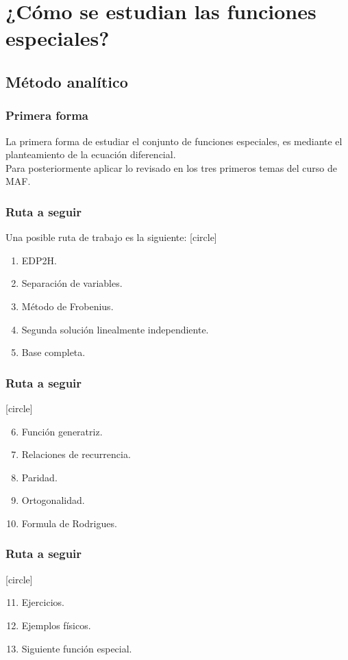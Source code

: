 \documentclass[12pt]{beamer}
\begin{document}
\section{¿Cómo se estudian las funciones especiales?}
\subsection{Método analítico}

\begin{frame}
\frametitle{Primera forma}
La primera forma de estudiar el conjunto de funciones especiales, es mediante el planteamiento de la ecuación diferencial.
\\
\bigskip
\pause
Para posteriormente aplicar lo revisado en los tres primeros temas del curso de MAF.
\end{frame}
\begin{frame}
\frametitle{Ruta a seguir}
Una posible ruta de trabajo es la siguiente:
[circle]
\begin{enumerate}[<+->]
\item EDP2H.
\item Separación de variables.
\item Método de Frobenius.
\item Segunda solución linealmente independiente.
\item Base completa.
\end{enumerate}
\end{frame}
\begin{frame}
\frametitle{Ruta a seguir}
[circle]
\begin{enumerate}[<+->]
\setcounter{enumi}{5}
\item Función generatriz.
\item Relaciones de recurrencia.
\item Paridad.
\item Ortogonalidad.
\item Formula de Rodrigues.
\end{enumerate}
\end{frame}
\begin{frame}
\frametitle{Ruta a seguir}
[circle]
\begin{enumerate}[<+->]
\setcounter{enumi}{10}
\item Ejercicios.
\item Ejemplos físicos.
\item Siguiente función especial.
\end{enumerate}
\end{frame}
\end{document}
